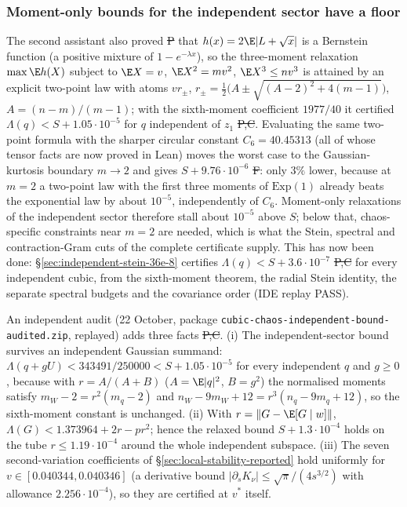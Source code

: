 \subsubsection{Moment-only bounds for the independent sector have a floor}
\label{sec:independent-sector-floor}
The second assistant also proved \st{P} that $h(x)=2\E|L+\sqrt x|$ is a
Bernstein function (a positive mixture of $1-e^{-\lambda x}$), so the
three-moment relaxation $\max\E h(X)$ subject to $\E X=v$,
$\E X^2=mv^2$, $\E X^3\le nv^3$ is attained by an explicit two-point
law with atoms $vr_\pm$, $r_\pm=\frac12\big(A\pm\sqrt{(A-2)^2+4(m-1)}\big)$,
$A=(n-m)/(m-1)$; with the sixth-moment coefficient $1977/40$ it certified
$\Lambda(q)<S+1.05\cdot10^{-5}$ for $q$ independent of $z_1$ \st{P,C}.
Evaluating the same two-point formula with the sharper circular constant
$C_6=40.45313$ (all of whose tensor facts are now proved in Lean) moves
the worst case to the Gaussian-kurtosis boundary $m\to2$ and gives
$S+9.76\cdot10^{-6}$ \st{F}: only $3\%$ lower, because at $m=2$ a two-point
law with the first three moments of $\mathrm{Exp}(1)$ already beats the
exponential law by about $10^{-5}$, independently of $C_6$. Moment-only
relaxations of the independent sector therefore stall about $10^{-5}$
above $S$; below that, chaos-specific constraints near $m=2$ are needed,
which is what the Stein, spectral and contraction-Gram cuts of the
complete certificate supply. This has now been done: \S\ref{sec:independent-stein-36e-8} certifies $\Lambda(q)<S+3.6\cdot10^{-7}$ \st{P,C} for every independent cubic, from the sixth-moment theorem, the radial Stein identity, the separate spectral budgets and the covariance order (IDE replay PASS).

An independent audit (22 October, package
\texttt{cubic-chaos-independent-bound-audited.zip}, replayed) adds three
facts \st{P,C}. (i) The independent-sector bound survives an independent
Gaussian summand: $\Lambda(q+gU)<343491/250000<S+1.05\cdot10^{-5}$ for every
independent $q$ and $g\ge0$, because with $r=A/(A+B)$ ($A=\E|q|^2$,
$B=g^2$) the normalised moments satisfy $m_W-2=r^2(m_q-2)$ and
$n_W-9m_W+12=r^3(n_q-9m_q+12)$, so the sixth-moment constant is unchanged.
(ii) With $r=\|G-\E[G\mid w]\|$, $\Lambda(G)<1.373964+2r-pr^2$; hence the
relaxed bound $S+1.3\cdot10^{-4}$ holds on the tube $r\le1.19\cdot10^{-4}$
around the whole independent subspace. (iii) The seven second-variation
coefficients of \S\ref{sec:local-stability-reported} hold uniformly for
$v\in[0.040344,0.040346]$ (a derivative bound
$|\partial_sK_\nu|\le\sqrt\pi/(4s^{3/2})$ with allowance $2.256\cdot10^{-4}$),
so they are certified at $v^*$ itself.


